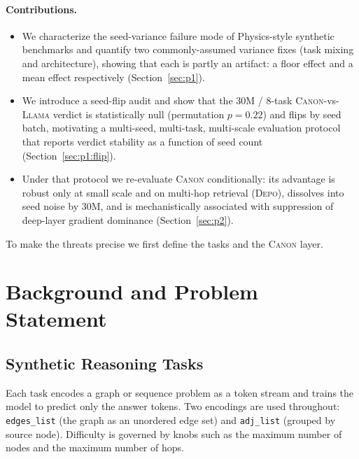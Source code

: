 \documentclass{article}
\newcommand{\Canon}{\textsc{Canon}\xspace}
\newcommand{\Depo}{\textsc{Depo}\xspace}
\newcommand{\Llama}{\textsc{Llama}\xspace}
\begin{document}
\paragraph{Contributions.}
\begin{itemize}
  \item We characterize the seed-variance failure mode of Physics-style synthetic benchmarks
        and quantify two commonly-assumed variance fixes (task mixing and architecture),
        showing that each is partly an artifact: a floor effect and a mean effect respectively
        (Section~\ref{sec:p1}).
  \item We introduce a seed-flip audit and show that the 30M / 8-task \Canon-vs-\Llama verdict
        is statistically null (permutation $p=0.22$) and flips by seed batch, motivating a
        multi-seed, multi-task, multi-scale evaluation protocol that reports verdict stability
        as a function of seed count (Section~\ref{sec:p1:flip}).
  \item Under that protocol we re-evaluate \Canon conditionally: its advantage is robust only
        at small scale and on multi-hop retrieval (\Depo), dissolves into seed noise by 30M,
        and is mechanistically associated with suppression of deep-layer gradient dominance
        (Section~\ref{sec:p2}).
\end{itemize}

To make the threats precise we first define the tasks and the \Canon layer.

\section{Background and Problem Statement}
\label{sec:background}

\subsection{Synthetic Reasoning Tasks}
\label{sec:background:tasks}

Each task encodes a graph or sequence problem as a token stream and trains the model to
predict only the answer tokens. Two encodings are used throughout: \texttt{edges\_list}
(the graph as an unordered edge set) and \texttt{adj\_list} (grouped by source node).
Difficulty is governed by knobs such as the maximum number of nodes and the maximum number
of hops.
\end{document}
